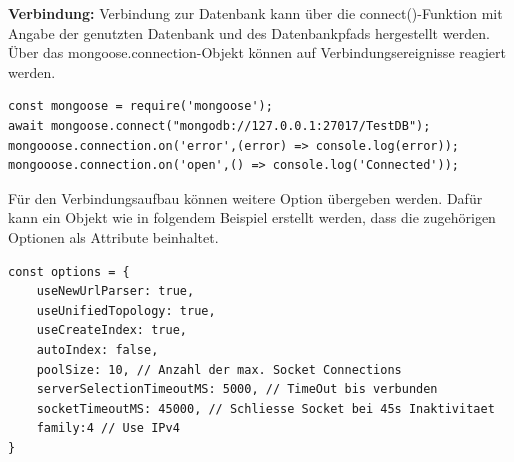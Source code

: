 \newpage
\noindent
\textbf{Verbindung:}
Verbindung zur Datenbank kann über die connect()-Funktion mit Angabe der genutzten Datenbank und des Datenbankpfads hergestellt werden. 
Über das mongoose.connection-Objekt können auf Verbindungsereignisse reagiert werden. 
\newline

\begin{lstlisting}[caption=Mongoose: Verbindung zur Datenbank aufbauen,
label=lst:MongooseConnect]
const mongoose = require('mongoose');
await mongoose.connect("mongodb://127.0.0.1:27017/TestDB");
mongooose.connection.on('error',(error) => console.log(error));
mongooose.connection.on('open',() => console.log('Connected'));
\end{lstlisting}

\noindent
Für den Verbindungsaufbau können weitere Option übergeben werden. Dafür kann ein Objekt wie in folgendem Beispiel erstellt werden, dass die zugehörigen Optionen als Attribute beinhaltet. 
\newline

\begin{lstlisting}[caption=Mongoose Verbindungsoptionen \protect \footnotemark  ,label=lst:MongooseConnect]
const options = {
	useNewUrlParser: true,
	useUnifiedTopology: true,
	useCreateIndex: true,
	autoIndex: false,
	poolSize: 10, // Anzahl der max. Socket Connections
	serverSelectionTimeoutMS: 5000, // TimeOut bis verbunden
	socketTimeoutMS: 45000, // Schliesse Socket bei 45s Inaktivitaet
	family:4 // Use IPv4
}
\end{lstlisting}


